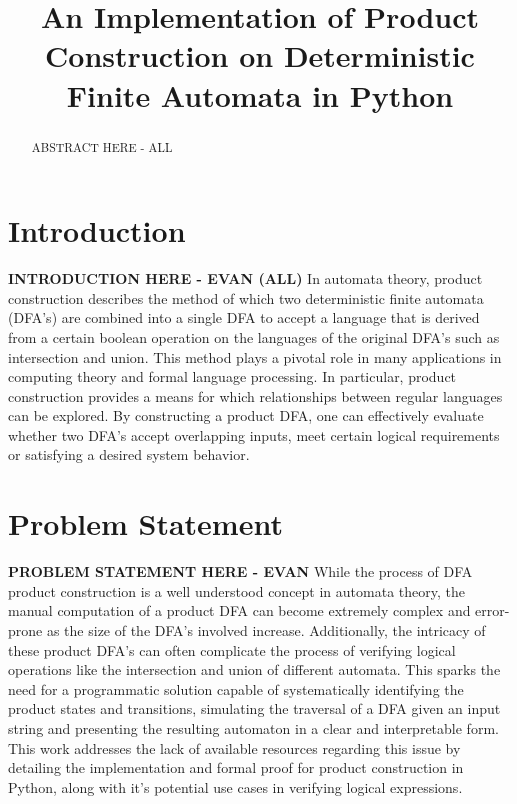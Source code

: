 \documentclass[conference]{IEEEtran}
\begin{document}
\title{An Implementation of Product Construction on Deterministic Finite Automata in Python}

\author{
\and
{}
\and
{}
}

\maketitle

\begin{abstract}
ABSTRACT HERE - ALL
\end{abstract}

\section{Introduction}
\textbf{INTRODUCTION HERE - EVAN (ALL)}
In automata theory, product construction describes the method of which two deterministic finite automata (DFA's) are combined into a single DFA to accept a language that is derived from a certain boolean operation on the languages of the original DFA's such as intersection and union. This method plays a pivotal role in many applications in computing theory and formal language processing. In particular, product construction provides a means for which relationships between regular languages can be explored. By constructing a product DFA, one can effectively evaluate whether two DFA's accept overlapping inputs, meet certain logical requirements or satisfying a desired system behavior.
\section{Problem Statement}
\textbf{PROBLEM STATEMENT HERE - EVAN}
While the process of DFA product construction is a well understood concept in automata theory, the manual computation of a product DFA can become extremely complex and error-prone as the size of the DFA's involved increase. Additionally, the intricacy of these product DFA's can often complicate the process of verifying logical operations like the intersection and union of different automata. This sparks the need for a programmatic solution capable of systematically identifying the product states and transitions, simulating the traversal of a DFA given an input string and presenting the resulting automaton in a clear and interpretable form. This work addresses the lack of available resources regarding this issue by detailing the implementation and formal proof for product construction in Python, along with it's potential use cases in verifying logical expressions.
\end{document}
